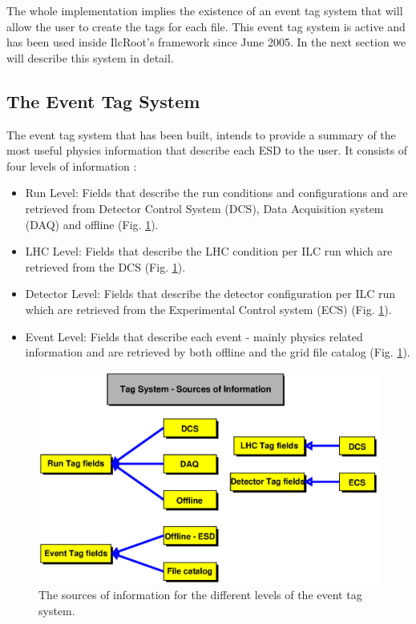 \documentclass[12pt,a4paper,twoside]{article}
\begin{document}
{The whole implementation implies the existence of an event tag system
that will allow the user to create the tags for each file. This event
tag system is active and has been used inside IlcRoot's framework
\cite{ilcroot} since June 2005. In the next section we will describe
this system in detail. 


\subsection{The Event Tag System}

The event tag system that has been built, intends to provide a summary
of the most useful physics information that describe each ESD to the
user. It consists of four levels of information \cite{EventTagWeb}: 

\begin{itemize}

\item Run Level: Fields that describe the run conditions and
  configurations and are retrieved from Detector Control System (DCS),
  Data Acquisition system (DAQ) and offline (Fig. \ref{sources}). 

\item LHC Level: Fields that describe the LHC condition per ILC run
  which are retrieved from the DCS (Fig. \ref{sources}). 

\item Detector Level: Fields that describe the detector configuration
  per ILC run which are retrieved from the Experimental Control
  system (ECS) (Fig. \ref{sources}). 

\item Event Level: Fields that describe each event - mainly physics
  related information and are retrieved by both offline and the grid
  file catalog (Fig. \ref{sources}). 

\end{itemize}

\begin{figure}[ht!]
    \centering
    \includegraphics[width=15cm]{picts/tagsources}
    \caption{The sources of information for the different levels of the event tag system.}
    \label{sources}
\end{figure}

}
\end{document}

